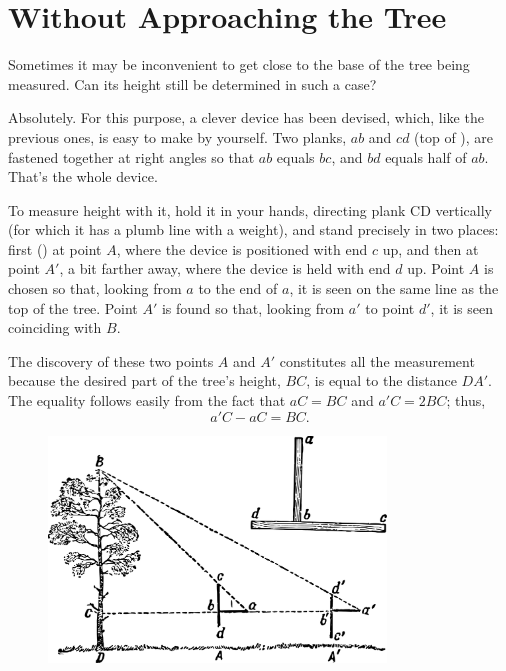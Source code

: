 \section{Without Approaching the Tree}
\label{sec-1.6}

Sometimes it may be inconvenient to get close to the base of the tree being measured. Can its height still be determined in such a case?

Absolutely. For this purpose, a clever device has been devised, which, like the previous ones, is easy to make by yourself. Two planks, $ab$ and $cd$ (top of ), are fastened together at right angles so that $ab$ equals $bc$, and $bd$ equals half of $ab$. That's the whole device. 

To measure height with it, hold it in your hands, directing plank CD vertically (for which it has a plumb line with a weight), and stand precisely in two places: first () at point $A$, where the device is positioned with end $c$ up, and then at point $A'$, a bit farther away, where the device is held with end $d$ up. Point $A$ is chosen so that, looking from $a$ to the end of $a$, it is seen on the same line as the top of the tree. Point $A'$ is found so that, looking from $a'$ to point $d'$, it is seen coinciding with $B$. 

The discovery of these two points $A$ and $A'$ constitutes all the measurement because the desired part of the tree's height, $BC$, is equal to the distance $DA'$. The equality follows easily from the fact that $aC = BC$ and $a'C = 2BC$; thus,
\begin{equation*}%
a'C - aC = BC.
\end{equation*}


\begin{figure}[h!]
\centering
\includegraphics[width=0.8\textwidth]{figures/ch-01/fig-01-10.pdf}
\end{figure}




